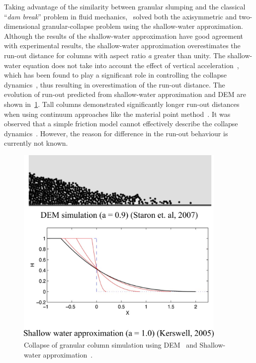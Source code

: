 Taking advantage 
of the similarity between granular slumping and the classical ``\textit{dam 
break}'' problem in fluid mechanics,~\citet{Kerswell2005} solved both the 
axisymmetric and two-dimensional granular-collapse problem using the 
shallow-water approximation. Although the results of the shallow-water 
approximation have good agreement with experimental results, the shallow-water 
approximation overestimates the run-out distance for columns with aspect ratio 
\textit{a} greater than unity. The shallow-water equation does not take into 
account the effect of vertical acceleration~\citep{Lajeunesse2005}, which has 
been found to play a significant role in controlling the collapse 
dynamics~\citep{Staron2007a}, thus resulting in overestimation of the run-out 
distance. The evolution of run-out predicted from shallow-water approximation 
and DEM are shown in~\cref{fig:DEM_Shallow}. Tall 
columns demonstrated significantly longer run-out distances when using 
continuum 
approaches like the material point method~\citep{Bandara2013,Mast2014}. It was 
observed that a simple friction model cannot effectively describe the collapse 
dynamics~\citep{Staron2007a}. However, the reason for difference in the run-out 
behaviour is currently not known. 

\begin{figure}
\centering
\includegraphics[width=0.9\textwidth]{DEM_Shallow}
\caption[Collapse of granular column simulation using DEM
and Shallow-water approximation.]{Collapse of granular column simulation using 
DEM~\citep{Staron2007a} and Shallow-water approximation~\citep{Kerswell2005}.}
\label{fig:DEM_Shallow}
\end{figure}

